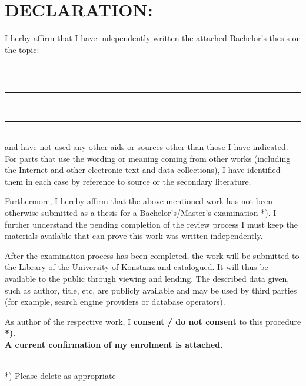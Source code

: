 \section*{DECLARATION:}
\ifodd\thepage
\edef\leftmark{DECLARATION}
\edef\rightmark{}
\else
\edef\rightmark{DECLARATION}
\edef\leftmark{}
\fi
I herby affirm that I have independently written the attached Bachelor’s
thesis on the topic:\\ 

\noindent
\rule{\linewidth}{0.4pt}\\[0.5cm]%
\rule{\linewidth}{0.4pt}\\[0.5cm]%
\rule{\linewidth}{0.4pt}\\[0.5cm]%
\noindent
and have not used any other aids or sources other than those I have indicated.\\

\noindent
For parts that use the wording or meaning coming from other works (including the
Internet and other electronic text and data collections), I have identified them in each
case by reference to source or the secondary literature.

\noindent
Furthermore, I hereby affirm that the above mentioned work has not been otherwise
submitted as a thesis for a Bachelor’s/Master’s examination *). I further understand
the pending completion of the review process I must keep the materials available that
can prove this work was written independently.

\noindent
After the examination process has been completed, the work will be submitted to the
Library of the University of Konstanz and catalogued. It will thus be available to the
public through viewing and lending. The described data given, such as author, title,
etc. are publicly available and may be used by third parties (for example, search
engine providers or database operators). 

\noindent
As author of the respective  work, I \textbf{consent / do not consent} to this procedure \textbf{*)}.\\

\noindent
\textbf{A current confirmation of my enrolment is attached.}\\[0.6cm]

\noindent
{}\\

*) Please delete as appropriate
\cleardoublepage
